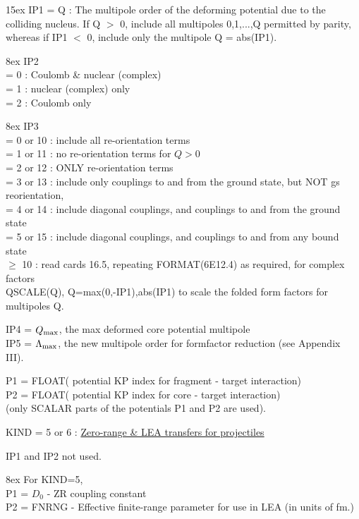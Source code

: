 \documentclass[11pt]{article}
\begin{document}
\hangindent 15ex
 IP1 = Q : The multipole order of the deforming potential due to
the colliding nucleus. If Q $>$ 0, include all multipoles 0,1,...,Q
permitted by parity, whereas if IP1 $<$ 0, include only the multipole
Q = abs(IP1).

\hangindent 8ex
IP2 
\\   = 0 : Coulomb \& nuclear (complex)
\\  = 1 : nuclear (complex) only
\\  = 2 : Coulomb only



\hangindent 8ex  IP3
\\  = 0 or 10 : include all re-orientation terms
\\  = 1 or 11 : no re-orientation terms for $Q > 0$
\\  = 2 or 12 : ONLY re-orientation terms
\\  = 3 or 13 : include only couplings to and from the ground state,
    but NOT gs reorientation,
\\  = 4 or 14 : include diagonal couplings,
                and  couplings to and from the ground state
\\  = 5 or 15 : include diagonal couplings,
                and  couplings to and from any bound state
\\  $\geq$ 10      : read cards 16.5,
repeating FORMAT(6E12.4) as required, for
complex factors \\QSCALE(Q), Q=max(0,-IP1),abs(IP1)
to scale the folded form factors for multipoles Q.

IP4 = $Q_{\rm max}$, the max deformed core potential multipole\\
IP5 = $\Lambda_{\rm max}$, the new multipole order for formfactor reduction
(see Appendix III).

 P1  = FLOAT( potential KP index for fragment - target interaction) \\
 P2  = FLOAT( potential KP index for core     - target interaction) \\
        (only SCALAR parts of the potentials P1 and P2 are used).
\bigskip

KIND = 5 or 6 :
\underline{Zero-range \& LEA transfers for projectiles}

IP1 and IP2 not used.

\hangindent 8ex  For KIND=5,
\\  P1 = $D_0$    - ZR coupling constant
\\  P2 = FNRNG - Effective finite-range parameter for use
in LEA (in units of fm.)
\end{document}
